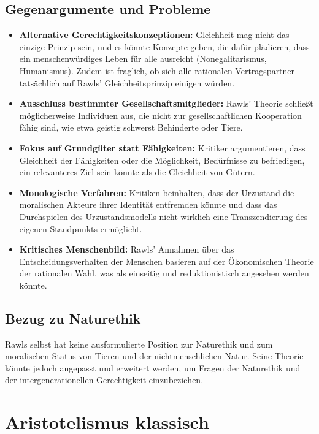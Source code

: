 \documentclass{article}
\begin{document}
\subsection*{Gegenargumente und Probleme}

\begin{itemize}
	\item \textbf{Alternative Gerechtigkeitskonzeptionen:} Gleichheit mag nicht das einzige Prinzip sein, und es könnte Konzepte geben, die dafür plädieren, dass ein menschenwürdiges Leben für alle ausreicht (Nonegalitarismus, Humanismus). Zudem ist fraglich, ob sich alle rationalen Vertragspartner tatsächlich auf Rawls' Gleichheitsprinzip einigen würden.
	\item \textbf{Ausschluss bestimmter Gesellschaftsmitglieder:} Rawls' Theorie schließt möglicherweise Individuen aus, die nicht zur gesellschaftlichen Kooperation fähig sind, wie etwa geistig schwerst Behinderte oder Tiere.
	\item \textbf{Fokus auf Grundgüter statt Fähigkeiten:} Kritiker argumentieren, dass Gleichheit der Fähigkeiten oder die Möglichkeit, Bedürfnisse zu befriedigen, ein relevanteres Ziel sein könnte als die Gleichheit von Gütern.
	\item \textbf{Monologische Verfahren:} Kritiken beinhalten, dass der Urzustand die moralischen Akteure ihrer Identität entfremden könnte und dass das Durchspielen des Urzustandsmodells nicht wirklich eine Transzendierung des eigenen Standpunkts ermöglicht.
	\item \textbf{Kritisches Menschenbild:} Rawls' Annahmen über das Entscheidungsverhalten der Menschen basieren auf der Ökonomischen Theorie der rationalen Wahl, was als einseitig und reduktionistisch angesehen werden könnte.
\end{itemize}

\subsection*{Bezug zu Naturethik}

Rawls selbst hat keine ausformulierte Position zur Naturethik und zum moralischen Status von Tieren und der nichtmenschlichen Natur. Seine Theorie könnte jedoch angepasst und erweitert werden, um Fragen der Naturethik und der intergenerationellen Gerechtigkeit einzubeziehen.

\newpage
\section{Aristotelismus klassisch}
\end{document}
